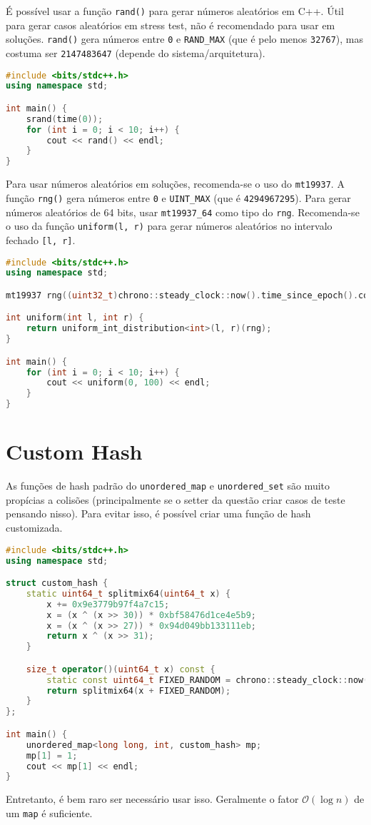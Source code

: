 É possível usar a função \texttt{rand()} para gerar números aleatórios em C++.
Útil para gerar casos aleatórios em stress test, não é recomendado para usar em soluções.
\texttt{rand()} gera números entre \texttt{0} e \texttt{RAND\_MAX} (que é pelo menos \texttt{32767}), mas costuma ser \texttt{2147483647} (depende do sistema/arquitetura).

\begin{lstlisting}[language=C++]
#include <bits/stdc++.h>
using namespace std;

int main() {
    srand(time(0));
    for (int i = 0; i < 10; i++) {
        cout << rand() << endl;
    }
}

\end{lstlisting}

Para usar números aleatórios em soluções, recomenda-se o uso do \texttt{mt19937}.
A função \texttt{rng()} gera números entre \texttt{0} e \texttt{UINT\_MAX} (que é \texttt{4294967295}).
Para gerar números aleatórios de 64 bits, usar \texttt{mt19937\_64} como tipo do \texttt{rng}.
Recomenda-se o uso da função \texttt{uniform(l, r)} para gerar números aleatórios no intervalo fechado \texttt{[l, r]}.

\begin{lstlisting}[language=C++]
#include <bits/stdc++.h>
using namespace std;

mt19937 rng((uint32_t)chrono::steady_clock::now().time_since_epoch().count());

int uniform(int l, int r) {
    return uniform_int_distribution<int>(l, r)(rng);
}

int main() {
    for (int i = 0; i < 10; i++) {
        cout << uniform(0, 100) << endl;
    }
}

\end{lstlisting}

\section{Custom Hash}

As funções de hash padrão do \texttt{unordered\_map} e \texttt{unordered\_set} são muito propícias a colisões (principalmente se o setter da questão criar casos de teste pensando nisso).
Para evitar isso, é possível criar uma função de hash customizada.

\begin{lstlisting}[language=C++]
#include <bits/stdc++.h>
using namespace std;

struct custom_hash {
    static uint64_t splitmix64(uint64_t x) {
        x += 0x9e3779b97f4a7c15;
        x = (x ^ (x >> 30)) * 0xbf58476d1ce4e5b9;
        x = (x ^ (x >> 27)) * 0x94d049bb133111eb;
        return x ^ (x >> 31);
    }

    size_t operator()(uint64_t x) const {
        static const uint64_t FIXED_RANDOM = chrono::steady_clock::now().time_since_epoch().count();
        return splitmix64(x + FIXED_RANDOM);
    }
};

int main() {
    unordered_map<long long, int, custom_hash> mp;
    mp[1] = 1;
    cout << mp[1] << endl;
}
\end{lstlisting}

Entretanto, é bem raro ser necessário usar isso. Geralmente o fator $\mathcal{O}(\log n)$ de um \texttt{map} é suficiente.